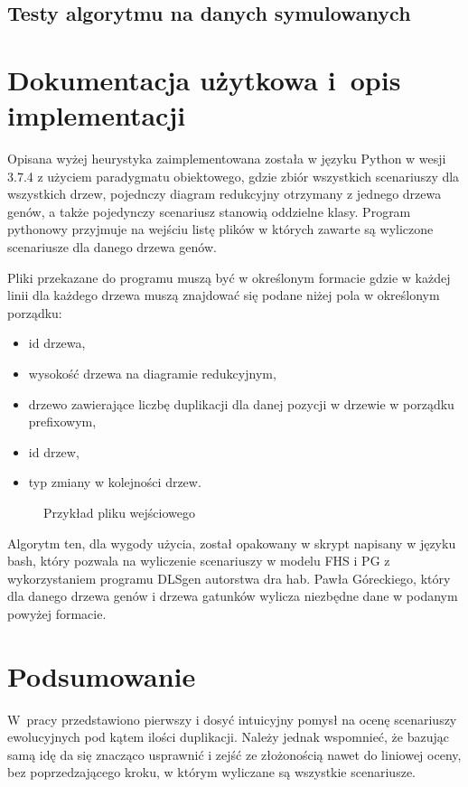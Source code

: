 \documentclass[licencjacka]{pracamgr}
\begin{document}
\section{Testy algorytmu na danych symulowanych}


\chapter{Dokumentacja użytkowa i~opis implementacji}\label{r:impl}

Opisana wyżej heurystyka zaimplementowana została w języku Python w wesji 3.7.4 z użyciem paradygmatu obiektowego, gdzie zbiór wszystkich scenariuszy dla wszystkich drzew, pojednczy diagram redukcyjny otrzymany z jednego drzewa genów, a także pojedynczy scenariusz stanowią oddzielne klasy. Program pythonowy przyjmuje na wejściu listę plików w których zawarte są wyliczone scenariusze dla danego drzewa genów.

Pliki przekazane do programu muszą być w określonym formacie gdzie w każdej linii dla każdego drzewa muszą znajdować się podane niżej pola w określonym porządku:
\begin{itemize}
\item id drzewa,
\item wysokość drzewa na diagramie redukcyjnym,
\item drzewo zawierające liczbę duplikacji dla danej pozycji w drzewie w porządku prefixowym,
\item id drzew, 
\item typ zmiany w kolejności drzew.
\end{itemize}

\begin{figure}[tp]
  \centering
  \caption{Przykład pliku wejściowego}
\end{figure}




Algorytm ten, dla wygody użycia, został opakowany w skrypt napisany w języku bash, który pozwala na wyliczenie scenariuszy w modelu FHS i PG z wykorzystaniem programu DLSgen autorstwa dra hab. Pawła Góreckiego, który dla danego drzewa genów i drzewa gatunków wylicza niezbędne dane w podanym powyżej formacie.

\chapter{Podsumowanie}

W~pracy przedstawiono pierwszy i dosyć intuicyjny pomysł na ocenę scenariuszy ewolucyjnych pod kątem ilości duplikacji. Należy jednak wspomnieć, że bazując samą idę da się znacząco usprawnić i zejść ze złożonością nawet do liniowej oceny, bez poprzedzającego kroku, w którym wyliczane są wszystkie scenariusze.  
\end{document}
